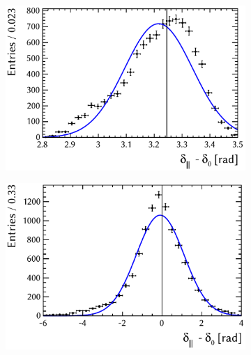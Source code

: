 \begin{figure}[tbp]
  \centering
  \begin{subfigure}{0.49\textwidth}
    \includegraphics[width=\textwidth]{graphics/results/parDist_polarDep_AparPhase}
    \caption{}
  \end{subfigure}
  \hfill%
  \begin{subfigure}{0.49\textwidth}
    \includegraphics[width=\textwidth]{graphics/results/pullDist_polarDep_AparPhase}
    \caption{}
  \end{subfigure}


\end{figure}
